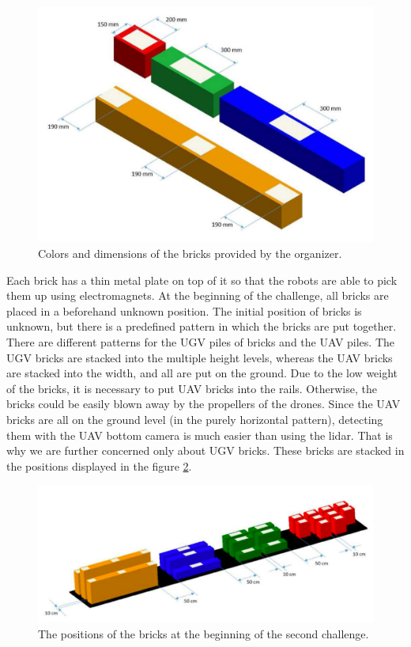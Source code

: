 \begin{figure}[H]

\centering
\includegraphics[scale=0.35]{fig/brick_sample.png}
\caption[Bricks definition]{Colors and dimensions of the bricks provided by the organizer.}
\label{fig:brickdef}

\end{figure}

Each brick has a thin metal plate on top of it so that the robots are able to pick them up using electromagnets. At the beginning of the challenge, all bricks are placed in a beforehand unknown position. The initial position of bricks is unknown, but there is a predefined pattern in which the bricks are put together. There are different patterns for the UGV piles of bricks and the UAV piles. The UGV bricks are stacked into the multiple height levels, whereas the UAV bricks are stacked into the width, and all are put on the ground. Due to the low weight of the bricks, it is necessary to put UAV bricks into the rails. Otherwise, the bricks could be easily blown away by the propellers of the drones. Since the UAV bricks are all on the ground level (in the purely horizontal pattern), detecting them with the UAV bottom camera is much easier than using the lidar. That is why we are further concerned only about UGV bricks. These bricks are stacked in the positions displayed in the figure \ref{fig:piledef}.

\begin{figure}[H]

\centering
\includegraphics[scale=0.35]{fig/initial_layout.png}
\caption[Initial brick layout]{The positions of the bricks at the beginning of the second challenge.}
\label{fig:piledef}

\end{figure}

